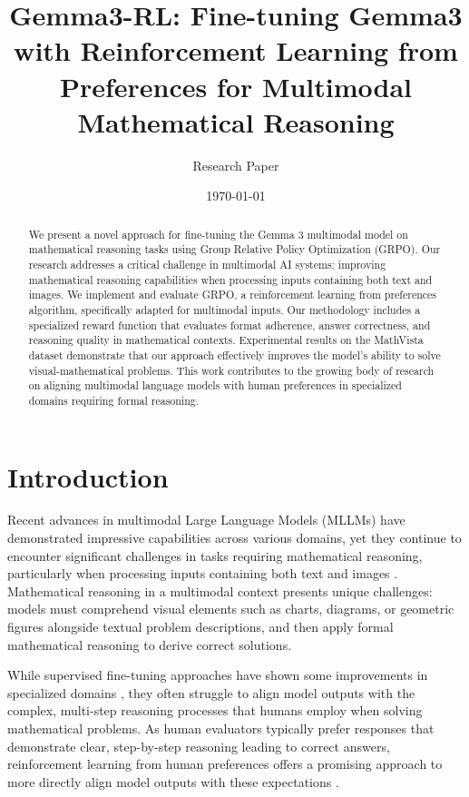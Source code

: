 \documentclass[11pt,a4paper]{article}
\title{Gemma3-RL: Fine-tuning Gemma3 with Reinforcement Learning from Preferences for Multimodal Mathematical Reasoning}
\author{Research Paper}
\date{\today}
\begin{document}
\maketitle

\begin{abstract}
We present a novel approach for fine-tuning the Gemma 3 multimodal model on mathematical reasoning tasks using Group Relative Policy Optimization (GRPO). Our research addresses a critical challenge in multimodal AI systems: improving mathematical reasoning capabilities when processing inputs containing both text and images. We implement and evaluate GRPO, a reinforcement learning from preferences algorithm, specifically adapted for multimodal inputs. Our methodology includes a specialized reward function that evaluates format adherence, answer correctness, and reasoning quality in mathematical contexts. Experimental results on the MathVista dataset demonstrate that our approach effectively improves the model's ability to solve visual-mathematical problems. This work contributes to the growing body of research on aligning multimodal language models with human preferences in specialized domains requiring formal reasoning.
\end{abstract}

\tableofcontents

\section{Introduction}

Recent advances in multimodal Large Language Models (MLLMs) have demonstrated impressive capabilities across various domains, yet they continue to encounter significant challenges in tasks requiring mathematical reasoning, particularly when processing inputs containing both text and images \cite{kojima2022large, hendrycks2021measuring}. Mathematical reasoning in a multimodal context presents unique challenges: models must comprehend visual elements such as charts, diagrams, or geometric figures alongside textual problem descriptions, and then apply formal mathematical reasoning to derive correct solutions.

While supervised fine-tuning approaches have shown some improvements in specialized domains \cite{wei2022chain, cobbe2021training}, they often struggle to align model outputs with the complex, multi-step reasoning processes that humans employ when solving mathematical problems. As human evaluators typically prefer responses that demonstrate clear, step-by-step reasoning leading to correct answers, reinforcement learning from human preferences offers a promising approach to more directly align model outputs with these expectations \cite{ouyang2022training, bai2022constitutional}.
\end{document}
